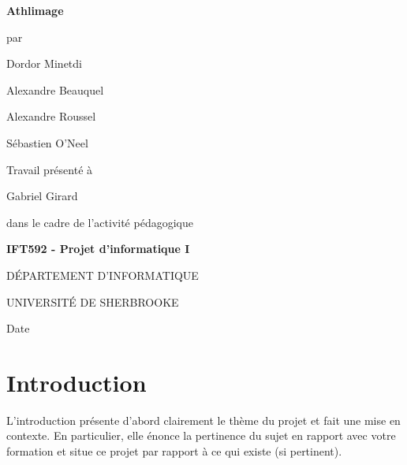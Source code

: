 \documentclass[12pt,fleqn]{article}
\renewcommand{\baselinestretch}{1.5}
\begin{document}
\def\always{{\vcenter{\vbox{\hrule height.4pt
                   \hbox{\vrule width.4pt height9pt \kern9pt
                         \vrule width.4pt}
                         \hrule height.4pt}}}}

\def\undertext#1{$\underline{\hbox{#1}}$}





\begin{center}
{\bf\LARGE    Athlimage }
\vspace{1cm}

par
\vspace{1cm}

Dordor Minetdi 

Alexandre Beauquel 

Alexandre Roussel 

Sébastien O'Neel

\vspace{1cm}
{\large Travail présenté à

Gabriel Girard

\vspace{0.5cm}

 dans le cadre de l'activité pédagogique
 \vspace{0.3cm}


{\bf IFT592 - Projet d'informatique I}


\vspace{1cm}


D\'EPARTEMENT D'INFORMATIQUE

UNIVERSIT\'E DE SHERBROOKE

\vspace{0.5cm}


Date}

\end{center}

\newpage

\renewcommand{\baselinestretch}{1.2}
\normalsize


\tableofcontents

\newpage

\section{Introduction}

L'introduction présente d’abord clairement le thème du projet et fait une mise en contexte. En particulier, elle énonce la pertinence du sujet en rapport avec votre formation et situe ce projet par rapport à ce qui existe (si pertinent).
\end{document}
